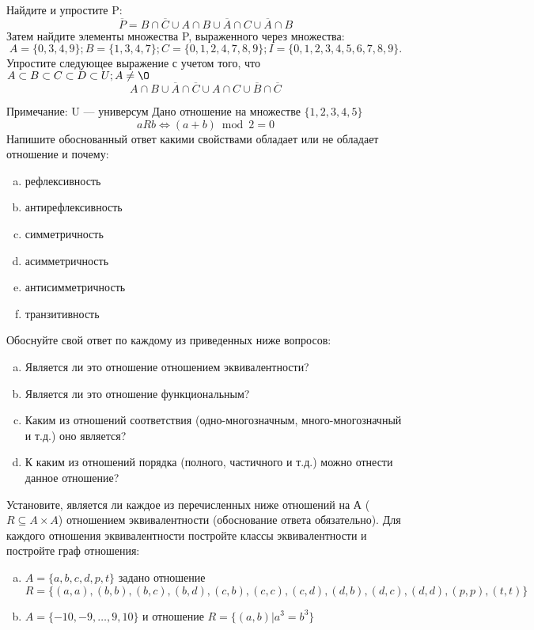 \documentclass[10pt]{exam}
\begin{document}
\begin{questions}
\question
Найдите и упростите P:
\begin{equation*}
\overline{P} = B \cap \overline{C} \cup A \cap B \cup \overline{A} \cap C \cup \overline{A} \cap B
\end{equation*}
Затем найдите элементы множества P, выраженного через множества:
\begin{equation*}
A = \{0, 3, 4, 9\}; 
B = \{1, 3, 4, 7\};
C = \{0, 1, 2, 4, 7, 8, 9\};
I = \{0, 1, 2, 3, 4, 5, 6, 7, 8, 9\}.
\end{equation*}\question
Упростите следующее выражение с учетом того, что $A\subset B \subset C \subset D \subset U; A \neq \O$
\begin{equation*}
A \cap B \cup \overline{A} \cap \overline{C} \cup A \cap C \cup \overline{B} \cap \overline{C}
\end{equation*}

Примечание: U — универсум\question
Дано отношение на множестве $\{1, 2, 3, 4, 5\}$ 
\begin{equation*}
aRb \iff (a+b) \bmod 2 =0
\end{equation*}
Напишите обоснованный ответ какими свойствами обладает или не обладает отношение и почему:   
\begin{enumerate} [a)]\setcounter{enumi}{0}
\item рефлексивность
\item антирефлексивность
\item симметричность
\item асимметричность
\item антисимметричность
\item транзитивность
\end{enumerate}

Обоснуйте свой ответ по каждому из приведенных ниже вопросов:
\begin{enumerate} [a)]\setcounter{enumi}{0}
    \item Является ли это отношение отношением эквивалентности?
    \item Является ли это отношение функциональным?
    \item Каким из отношений соответствия (одно-многозначным, много-многозначный и т.д.) оно является?
    \item К каким из отношений порядка (полного, частичного и т.д.) можно отнести данное отношение?
\end{enumerate}



\question
Установите, является ли каждое из перечисленных ниже отношений на А ($R \subseteq A \times A$) отношением эквивалентности (обоснование ответа обязательно). Для каждого отношения эквивалентности постройте классы 
эквивалентности и постройте граф отношения:
\begin{enumerate} [a)]\setcounter{enumi}{0}
\item $A = \{a, b, c, d, p, t\}$ задано отношение $R = \{(a, a), (b, b), (b, c), (b, d), (c, b), (c, c), (c, d), (d, b), (d, c), (d, d), (p,p), (t,t)\}$
\item $A = \{-10, -9, … , 9, 10\}$ и отношение $R = \{(a,b)|a^{3} = b^{3}\}$


\end{enumerate}
\end{questions}
\end{document}
